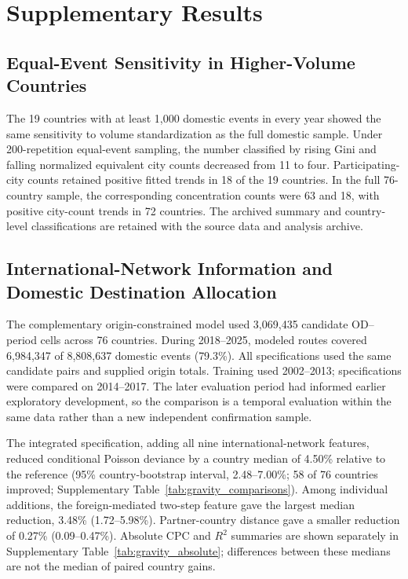 \clearpage
\section*{Supplementary Results}
\begingroup
\renewcommand{\thesubsection}{R\arabic{subsection}}
\setcounter{subsection}{0}
\renewcommand{\tablename}{Supplementary Table}
\setcounter{table}{3}

\subsection{Equal-Event Sensitivity in Higher-Volume Countries}
\label{supp:rarefaction}

The 19 countries with at least 1,000 domestic events in every year showed the same sensitivity to volume standardization as the full domestic sample. Under 200-repetition equal-event sampling, the number classified by rising Gini and falling normalized equivalent city counts decreased from 11 to four. Participating-city counts retained positive fitted trends in 18 of the 19 countries. In the full 76-country sample, the corresponding concentration counts were 63 and 18, with positive city-count trends in 72 countries. The archived summary and country-level classifications are retained with the source data and analysis archive.

\subsection{International-Network Information and Domestic Destination Allocation}
\label{supp:network_results}

The complementary origin-constrained model used 3,069,435 candidate OD--period cells across 76 countries. During 2018--2025, modeled routes covered 6,984,347 of 8,808,637 domestic events (79.3\%). All specifications used the same candidate pairs and supplied origin totals. Training used 2002--2013; specifications were compared on 2014--2017. The later evaluation period had informed earlier exploratory development, so the comparison is a temporal evaluation within the same data rather than a new independent confirmation sample.

The integrated specification, adding all nine international-network features, reduced conditional Poisson deviance by a country median of 4.50\% relative to the reference (95\% country-bootstrap interval, 2.48--7.00\%; 58 of 76 countries improved; Supplementary Table~\ref{tab:gravity_comparisons}). Among individual additions, the foreign-mediated two-step feature gave the largest median reduction, 3.48\% (1.72--5.98\%). Partner-country distance gave a smaller reduction of 0.27\% (0.09--0.47\%). Absolute CPC and $R^2$ summaries are shown separately in Supplementary Table~\ref{tab:gravity_absolute}; differences between these medians are not the median of paired country gains.

